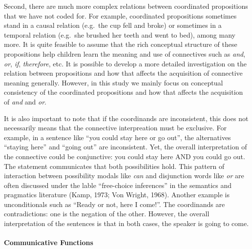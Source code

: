 \documentclass[oneside]{report}
\theoremstyle{definition}
\theoremstyle{definition}
\theoremstyle{definition}
\theoremstyle{remark}
\begin{document}
Second, there are much more complex relations between coordinated
propositions that we have not coded for. For example, coordinated
propositions sometimes stand in a causal relation (e.g.~the cup fell and
broke) or sometimes in a temporal relation (e.g.~she brushed her teeth
and went to bed), among many more. It is quite feasible to assume that
the rich conceptual structure of these propositions help children learn
the meaning and use of connectives such as \emph{and}, \emph{or},
\emph{if}, \emph{therefore}, etc. It is possible to develop a more
detailed investigation on the relation between propositions and how that
affects the acquisition of connective meaning generally. However, in
this study we mainly focus on conceptual consistency of the coordinated
propositions and how that affects the acquisition of \emph{and} and
\emph{or}.

It is also important to note that if the coordinands are inconsistent,
this does not necessarily means that the connective interpreation must
be exclusive. For example, in a sentence like ``you could stay here or
go out'', the alternatives ``staying here'' and ``going out'' are
inconsistent. Yet, the overall interpretation of the connective could be
conjunctive: you could stay here AND you could go out. The statement
communicates that both possibilities hold. This pattern of interaction
between possibility modals like \emph{can} and disjunction words like
\emph{or} are often discussed under the lable ``free-choice inferences''
in the semantics and pragmatics literature (Kamp, 1973; Von Wright,
1968). Another example is unconditionals such as ``Ready or not, here I
come!''. The coordinands are contradictions: one is the negation of the
other. However, the overall interpretation of the sentences is that in
both cases, the speaker is going to come.

\paragraph{Communicative Functions}\label{communicative-functions}
\end{document}
